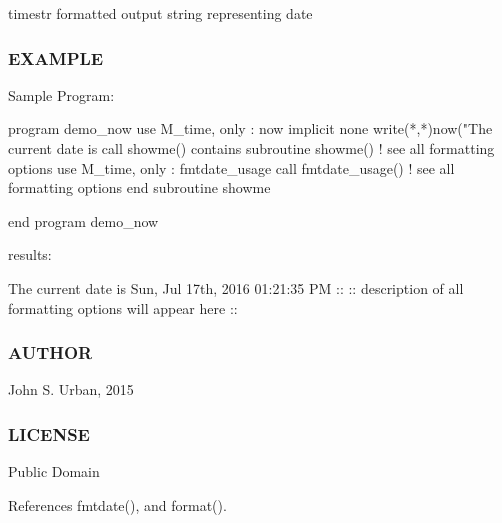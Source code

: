 timestr formatted output string representing date

\subsubsection*{E\+X\+A\+M\+P\+LE}

\begin{DoxyVerb}Sample Program:

 program demo_now
 use M_time, only : now
 implicit none
    write(*,*)now("The current date is %
    call showme()
 contains
 subroutine showme() ! see all formatting options
 use M_time, only : fmtdate_usage
    call fmtdate_usage() ! see all formatting options
 end subroutine showme

 end program demo_now

results:

   The current date is Sun, Jul 17th, 2016 01:21:35 PM
    ::
    :: description of all formatting options will appear here
    ::
\end{DoxyVerb}


\subsubsection*{A\+U\+T\+H\+OR}

John S. Urban, 2015 \subsubsection*{L\+I\+C\+E\+N\+SE}

Public Domain 

References fmtdate(), and format().


